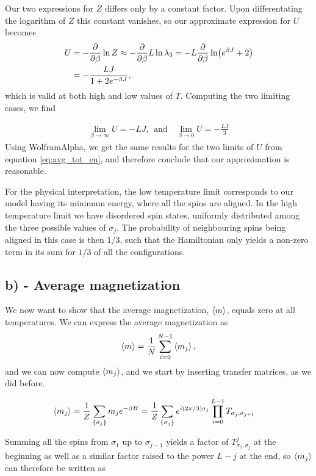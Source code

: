 \documentclass[reprint,english,notitlepage,aps,nobalancelastpage,nofootinbib]{revtex4-1}
\newcommand{\sumstate}{\sum_{\{\sigma_j\}}}
\newcommand{\prodstate}{\prod_{i=0}^{L-1}}
\newcommand{\ebj}{e^{\beta J}}
\newcommand{\T}[1]{T_{\sigma_{#1},\sigma_{#1 + 1}}}
\renewcommand{\l}{\lambda}
\newcommand{\mj}{m_j}
\begin{document}
Our two expressions for $Z$ differs only by a constant factor. Upon differentating the logarithm of $Z$ this constant vanishes, so our approximate expression for $U$ becomes       
\begin{align*}
	U&=-\pdv{\beta}\ln Z \approx -\pdv{\beta} L \ln \l_3 = -L \pdv{\beta}\ln (\ebj+2) \\ 
	&= -\frac{LJ}{1+2 e^{-\beta J}}, 
\end{align*}
which is valid at both high and low values of $T$. Computing the two limiting cases, we find  

\begin{align*}
	\lim_{\beta\to\infty} U = -LJ,\:\:\text{and}\quad \lim_{\beta\to0} U = -\frac{LJ}{3}
\end{align*}
Using WolframAlpha, we get the same results for the two limits of $U$ from equation \eqref{eq:avg_tot_en}, and therefore conclude that our approximation is reasonable. 

For the physical interpretation, the low temperature limit corresponds to our model having its minimum energy, where all the spins are aligned. In the high temperature limit we have disordered spin states, uniformly distributed among the three possible values of $\sigma_j$. The probability of neighbouring spins being aligned in this case is then $1/3$, such that the Hamiltonian only yields a non-zero term in its sum for $1/3$ of all the configurations.


\subsection*{b) - Average magnetization}

We now want to show that the average magnetization, $\expval{m}$, equals zero at all temperatures. We can express the average magnetization as 
\begin{align*}
	\expval{m} = \frac{1}{N} \sum_{i=0}^{N-1}\expval{m_j},
\end{align*}
and we can now compute $\expval{\mj}$, and we start by inserting transfer matrices, as we did before.  

\begin{align*}
	\expval{m_j} &= \frac{1}{Z} \sumstate \mj e^{-\beta H} = \frac{1}{Z} \sumstate e^{i(2\pi/3)\sigma_j} \prodstate \T{j}
\end{align*} 

Summing all the spins from $\sigma_1$ up to $\sigma_{j-1}$ yields a factor of $T_{\sigma_0,\sigma_j}^j$ at the beginning as well as a similar factor raised to the power $L-j$ at the end, so $\expval{\mj}$ can therefore be written as   
\end{document}
